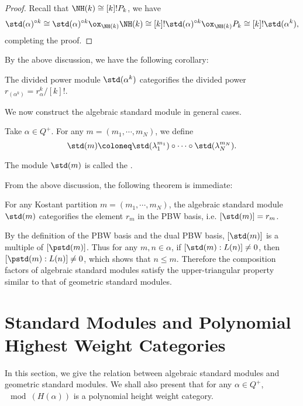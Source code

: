 \begin{proof}
    Recall that $\NH(k)\cong [k]!P_k$, we have
    \[
        \std(\alpha)^{\circ k}\cong \std(\alpha)^{\circ k}\ox_{\NH(k)}\NH(k)
        \cong [k]!\std(\alpha)^{\circ k}\ox_{\NH(k)}P_k
        \cong[k]!\std(\alpha^k),
    \] 
    completing the proof.
\end{proof}

By the above discussion, we have the following corollary:

\begin{corollary}
    The divided power module $\std(\alpha^k)$ categorifies the divided power 
    $r_{(\alpha^k)} = r_\alpha^k/[k]!$.
\end{corollary}

We now construct the algebraic standard module in general cases.

Take $\alpha\in Q^+$. For any $m = (m_1,\cdots, m_N)$,
we define 
\[
    \std(m) \coloneq  \std(\lambda_1^{m_1})\circ\cdots
    \circ\std(\lambda_N^{m_N}).
\]

\begin{definition}
    The module $\std(m)$ is called the .
\end{definition}

From the above discussion, the following theorem is immediate:

\begin{theorem}\label{std-modules}
    For any Kostant partition $m = (m_1,\cdots,m_N)$, the algebraic standard module $\std(m)$
    categorifies the element $r_m$ in the PBW basis,
    i.e. $[\std(m)] = r_m$.
\end{theorem}

\begin{remark}
    By the definition of the PBW basis and the dual PBW basis,
    $[\std(m)]$ is a multiple of $[\pstd(m)]$.
    Thus for any $m,n\in\alpha$, if $[\std(m):L(n)]\ne 0$,
    then $[\pstd(m):L(n)]\ne 0$, which shows that $n\le m$.
    Therefore the composition factors of algebraic standard modules
    satisfy the upper-triangular property similar to that of
    geometric standard modules.
\end{remark}

\section{Standard Modules and Polynomial Highest Weight Categories}

In this section, we give the relation between algebraic standard modules
and geometric standard modules. We shall also present that
for any $\alpha\in Q^+$,
$\mod(H(\alpha))$ is a polynomial height weight category.


